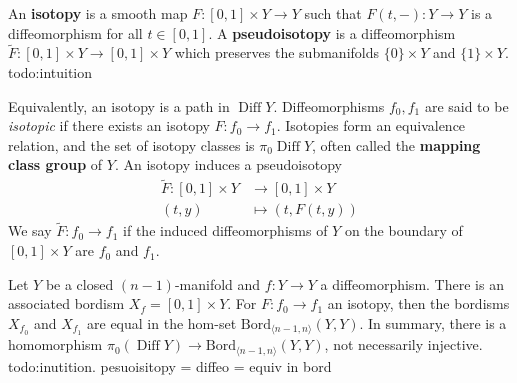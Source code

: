 \begin{definition}[]
    An \textbf{isotopy} is a smooth map $F \colon [0,1] \times Y\to Y$ such that $F (t,-) \colon Y \to Y$ is a diffeomorphism for all $t \in [0,1]$. A \textbf{pseudoisotopy} is a diffeomorphism $\widetilde F \colon [0,1] \times Y \to [0,1] \times Y$ which preserves the submanifolds $\{0\} \times Y$ and $\{1\} \times Y$. {\color{red}todo:intuition} 
\end{definition}
Equivalently, an isotopy is a path in $\operatorname{Diff}Y$. Diffeomorphisms $f_0,f_1$ are said to be \emph{isotopic} if there exists an isotopy $F \colon f_0 \to f_1$. Isotopies form an equivalence relation, and the set of isotopy classes is $\pi_0 \operatorname{Diff}Y$, often called the \textbf{mapping class group} of $Y$. An isotopy induces a pseudoisotopy 
\begin{align*}
    \widetilde F \colon [0,1]\times Y &\to [0,1] \times Y\\
    (t,y) &\mapsto  (t, F(t,y))
\end{align*}
We say $\widetilde F \colon f_0 \to f_1 $ if the induced diffeomorphisms of $Y$ on the boundary of $[0,1] \times Y$ are $f_0$ and $f_1$.
\begin{example}
    Let $Y$ be a closed $(n-1)$-manifold and $f \colon Y \to Y$ a diffeomorphism. There is an associated bordism $X_f =[0,1] \times Y$. For $F \colon f_0 \to f_1$ an isotopy, then the bordisms $X_{f_0}$ and $X_{f_1}$ are equal in the hom-set $\mathrm{Bord}_{\langle n-1,n \rangle }(Y,Y)  $. In summary, there is a homomorphism $\pi_0(\operatorname{Diff}Y) \to \mathrm{Bord}_{\langle n-1,n \rangle }(Y,Y)$, not necessarily injective. {\color{red}todo:inutition. pesuoisitopy = diffeo = equiv in bord} 
\end{example}


